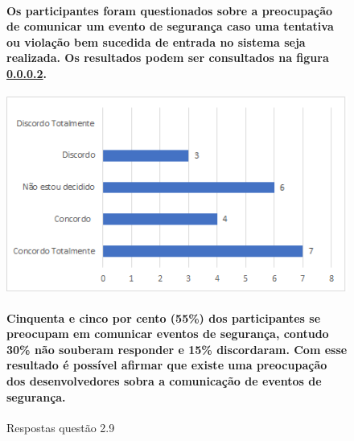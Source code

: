\begin{figure}[!t]
\centering
\paragraph{Os participantes foram questionados sobre a preocupação de comunicar um evento de segurança caso uma tentativa ou violação bem sucedida de entrada no sistema seja realizada. Os resultados podem ser consultados na figura \ref{fig:2.9}.}
\includegraphics[scale=0.7]{figuras das questoes/2.9.png}
\caption{Respostas questão 2.9}

\paragraph{Cinquenta e cinco por cento (55{\%}) dos participantes se preocupam em comunicar eventos de segurança, contudo 30{\%} não souberam responder e 15{\%} discordaram. Com esse resultado é possível afirmar que existe uma preocupação dos desenvolvedores sobra a comunicação de eventos de segurança.} 

\label{fig:2.9}
\end{figure}
